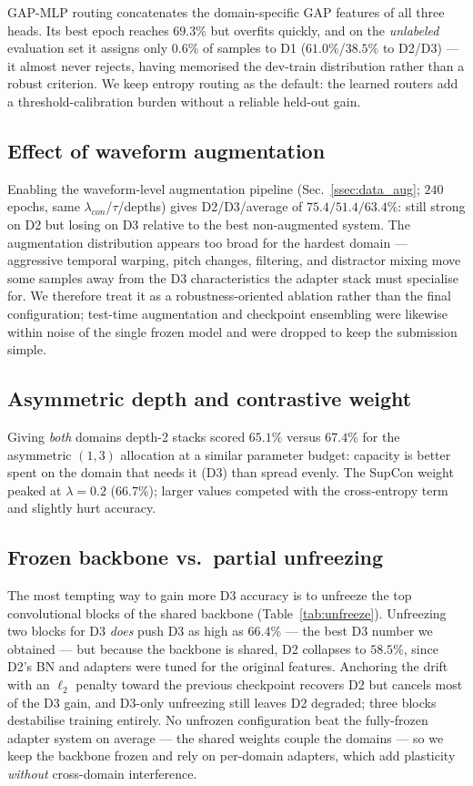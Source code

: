 \documentclass[9pt,conference]{IEEEtran}
\begin{document}
GAP-MLP routing concatenates the domain-specific GAP features of all three
heads. Its best epoch reaches $69.3\%$ but overfits quickly, and on the
\emph{unlabeled} evaluation set it assigns only $0.6\%$ of samples to D1
($61.0\%$/$38.5\%$ to D2/D3) --- it almost never rejects, having memorised
the dev-train distribution rather than a robust criterion. We keep entropy
routing as the default: the learned routers add a threshold-calibration
burden without a reliable held-out gain.

\subsection{Effect of waveform augmentation}
\label{ssec:aug_results}
Enabling the waveform-level augmentation pipeline
(Sec.~\ref{ssec:data_aug}; $240$ epochs, same $\lambda_{con}$/$\tau$/depths)
gives D2/D3/average of $75.4/51.4/63.4\%$: still strong on D2 but losing on
D3 relative to the best non-augmented system. The augmentation distribution
appears too broad for the hardest domain --- aggressive temporal warping,
pitch changes, filtering, and distractor mixing move some samples away from
the D3 characteristics the adapter stack must specialise for. We therefore
treat it as a robustness-oriented ablation rather than the final
configuration; test-time augmentation and checkpoint ensembling were
likewise within noise of the single frozen model and were dropped to keep
the submission simple.

\subsection{Asymmetric depth and contrastive weight}
\label{ssec:choices}

Giving \emph{both} domains depth-2 stacks scored $65.1\%$ versus $67.4\%$
for the asymmetric $(1,3)$ allocation at a similar parameter budget:
capacity is better spent on the domain that needs it (D3) than spread
evenly. The SupCon weight peaked at $\lambda=0.2$ ($66.7\%$); larger values
competed with the cross-entropy term and slightly hurt accuracy.

\subsection{Frozen backbone vs.\ partial unfreezing}
\label{ssec:discussion}

The most tempting way to gain more D3 accuracy is to unfreeze the top
convolutional blocks of the shared backbone (Table~\ref{tab:unfreeze}).
Unfreezing two blocks for D3 \emph{does} push D3 as high as $66.4\%$ ---
the best D3 number we obtained --- but because the backbone is shared, D2
collapses to $58.5\%$, since D2's BN and adapters were tuned for the
original features. Anchoring the drift with an $\ell_2$ penalty toward the
previous checkpoint recovers D2 but cancels most of the D3 gain, and
D3-only unfreezing still leaves D2 degraded; three blocks destabilise
training entirely. No unfrozen configuration beat the fully-frozen adapter
system on average --- the shared weights couple the domains --- so we keep
the backbone frozen and rely on per-domain adapters, which add plasticity
\emph{without} cross-domain interference.
\end{document}
